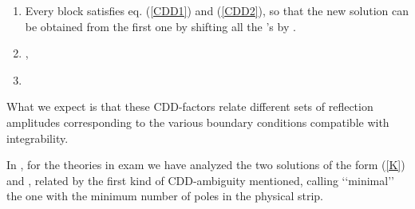 \documentclass[a4paper,12pt]{report}
\begin{document}
\begin{enumerate}

\item {\coordHE{}}

Every block \coordHE{} satisfies eq. (\ref{CDD1}) and (\ref{CDD2}), so that the new solution
can be obtained from the first one by shifting all the \coordHE{}'s by \coordHE{}.


\item {\coordHE{}, \coordHE{}  }

\item {\coordHE{} }


\end{enumerate}
What we expect is that these CDD-factors relate different sets of reflection amplitudes corresponding to the
various boundary conditions compatible with integrability.

\vspace{0.5cm}

In \cite{io}, for the theories in exam we have analyzed the two solutions of the form (\ref{K}) \coordHE{}
and \coordHE{}, related by the first kind of CDD-ambiguity mentioned, calling \lq\lq minimal\rq\rq \,
the one with the minimum number of poles in the physical strip.
\end{document}
